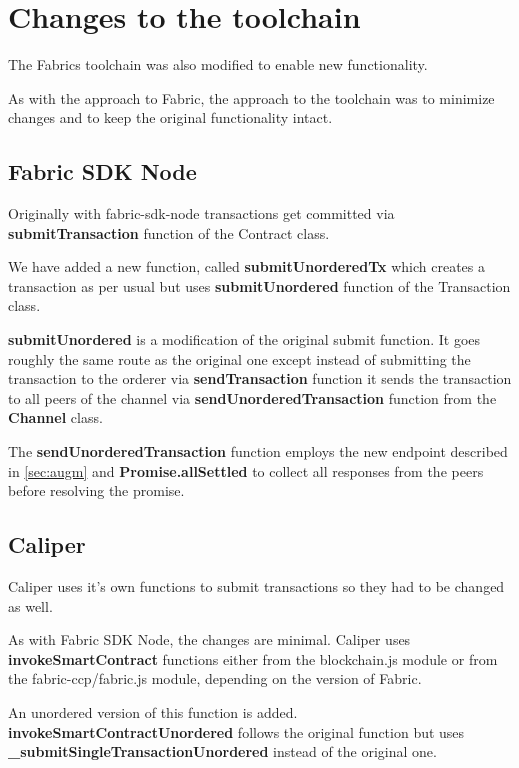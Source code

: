 \chapter{Changes to the toolchain}\label{chapter:sdks}

The Fabrics toolchain was also modified to enable new functionality.

As with the approach to Fabric, the approach to the toolchain was to minimize changes and to keep the original functionality intact.

\section{Fabric SDK Node}\label{sec:sdk}

Originally with fabric-sdk-node transactions get committed via \textbf{submitTransaction} function of the Contract class.

We have added a new function, called \textbf{submitUnorderedTx} which creates a transaction as per usual but uses \textbf{submitUnordered} function of the Transaction class.

\textbf{submitUnordered} is a modification of the original submit function.
It goes roughly the same route as the original one except instead of submitting the transaction to the orderer via \textbf{sendTransaction} function it sends the transaction to all peers of the channel via \textbf{sendUnorderedTransaction} function from the \textbf{Channel} class.

The \textbf{sendUnorderedTransaction} function employs the new endpoint described in \ref{sec:augm} and \textbf{Promise.allSettled} to collect all responses from the peers before resolving the promise.

\section{Caliper}\label{sec:caliper}

Caliper uses it's own functions to submit transactions so they had to be changed as well.

As with Fabric SDK Node, the changes are minimal. Caliper uses \textbf{invokeSmartContract} functions either from the blockchain.js module or from the fabric-ccp/fabric.js module, depending on the version of Fabric.

An unordered version of this function is added. \textbf{invokeSmartContractUnordered} follows the original function but uses \textbf{\_submitSingleTransactionUnordered} instead of the original one.


